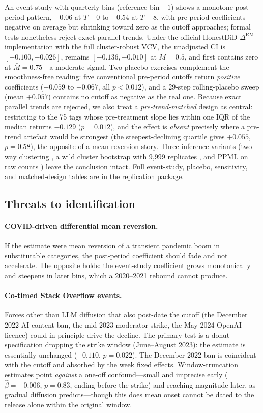 An event study with quarterly bins (reference bin $-1$) shows a
monotone post-period pattern, $-0.06$ at $T{+}0$ to $-0.54$ at
$T{+}8$, with pre-period coefficients negative on average but
shrinking toward zero as the cutoff approaches; formal tests
nonetheless reject exact parallel trends. Under the official
HonestDiD $\Delta^{\text{RM}}$ implementation with the full
cluster-robust VCV, the unadjusted CI is $[-0.100,-0.026]$,
remains $[-0.136,-0.010]$ at $\bar M=0.5$, and first contains
zero at $\bar M=0.75$---a moderate signal. Two placebo
exercises complement the smoothness-free reading: five
conventional pre-period cutoffs return \emph{positive}
coefficients ($+0.059$ to $+0.067$, all $p<0.012$), and a
29-step rolling-placebo sweep (mean $+0.057$) contains no
cutoff as negative as the real one. Because exact parallel
trends are rejected, we also treat a \emph{pre-trend-matched}
design as central: restricting to the 75 tags whose
pre-treatment slope lies within one IQR of the median returns
$-0.129$ ($p=0.012$), and the effect is \emph{absent} precisely
where a pre-trend artefact would be strongest (the
steepest-declining quartile gives $+0.055$, $p=0.58$), the
opposite of a mean-reversion story. Three inference variants
(two-way clustering \citep{cameron2011robust}, a wild cluster
bootstrap with 9{,}999 replicates \citep{cameron2008wild}, and
PPML on raw counts \citep{santossilva2006log}) leave the
conclusion intact. Full event-study, placebo, sensitivity, and
matched-design tables are in the replication package.

\subsection{Threats to identification}\label{ssec:id_threats}

\paragraph{COVID-driven differential mean reversion.}
If the estimate were mean reversion of a transient pandemic
boom in substitutable categories, the post-period coefficient
should fade and not accelerate. The opposite holds: the
event-study coefficient grows monotonically and steepens in
later bins, which a 2020--2021 rebound cannot produce.

\paragraph{Co-timed Stack Overflow events.}
Forces other than LLM diffusion that also post-date the cutoff
(the December 2022 AI-content ban, the mid-2023 moderator
strike, the May 2024 OpenAI licence) could in principle drive
the decline. The primary test is a donut specification dropping
the strike window (June--August 2023): the estimate is
essentially unchanged ($-0.110$, $p=0.022$). The December 2022
ban is coincident with the cutoff and absorbed by the week
fixed effects. Window-truncation estimates point \emph{against}
a one-off confound---small and imprecise early
($\hat\beta=-0.006$, $p=0.83$, ending before the strike) and
reaching magnitude later, as gradual diffusion predicts---though
this does mean onset cannot be dated to the release alone within
the original window.

